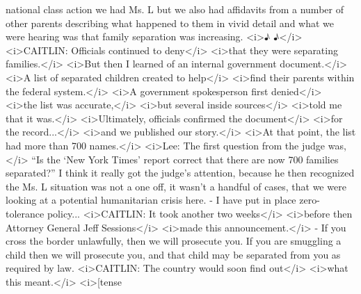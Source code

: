 \begin{itemize}
\begin{itemize}
    national class action we had Ms. L but we also had affidavits from a
    number of other parents describing what happened to them in vivid
    detail and what we were hearing was that family separation was
    increasing. \textless{}i\textgreater{}♪ ♪\textless{}/i\textgreater{}
    \textless{}i\textgreater{}CAITLIN: Officials continued to
    deny\textless{}/i\textgreater{} \textless{}i\textgreater{}that they
    were separating families.\textless{}/i\textgreater{}
    \textless{}i\textgreater{}But then I learned of an internal
    government document.\textless{}/i\textgreater{}
    \textless{}i\textgreater{}A list of separated children created to
    help\textless{}/i\textgreater{} \textless{}i\textgreater{}find their
    parents within the federal system.\textless{}/i\textgreater{}
    \textless{}i\textgreater{}A government spokesperson first
    denied\textless{}/i\textgreater{} \textless{}i\textgreater{}the list
    was accurate,\textless{}/i\textgreater{}
    \textless{}i\textgreater{}but several inside
    sources\textless{}/i\textgreater{} \textless{}i\textgreater{}told me
    that it was.\textless{}/i\textgreater{}
    \textless{}i\textgreater{}Ultimately, officials confirmed the
    document\textless{}/i\textgreater{} \textless{}i\textgreater{}for
    the record...\textless{}/i\textgreater{}
    \textless{}i\textgreater{}and we published our
    story.\textless{}/i\textgreater{} \textless{}i\textgreater{}At that
    point, the list had more than 700 names.\textless{}/i\textgreater{}
    \textless{}i\textgreater{}Lee: The first question from the judge
    was,\textless{}/i\textgreater{} ``Is the `New York Times' report
    correct that there are now 700 families separated?'' I think it
    really got the judge's attention, because he then recognized the Ms.
    L situation was not a one off, it wasn't a handful of cases, that we
    were looking at a potential humanitarian crisis here. - I have put
    in place zero-tolerance policy... \textless{}i\textgreater{}CAITLIN:
    It took another two weeks\textless{}/i\textgreater{}
    \textless{}i\textgreater{}before then Attorney General Jeff
    Sessions\textless{}/i\textgreater{} \textless{}i\textgreater{}made
    this announcement.\textless{}/i\textgreater{} - If you cross the
    border unlawfully, then we will prosecute you. If you are smuggling
    a child then we will prosecute you, and that child may be separated
    from you as required by law. \textless{}i\textgreater{}CAITLIN: The
    country would soon find out\textless{}/i\textgreater{}
    \textless{}i\textgreater{}what this
    meant.\textless{}/i\textgreater{} \textless{}i\textgreater{}{[}tense

\end{itemize}
\end{itemize}
